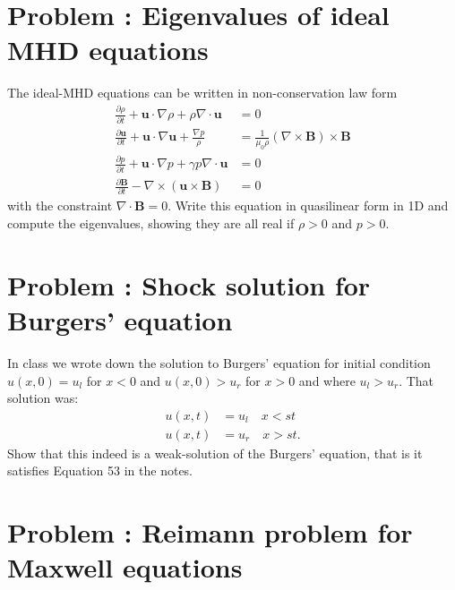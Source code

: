 \documentclass[12pt]{article}
\theoremstyle{definition}
\theoremstyle{definition}
\theoremstyle{definition}
\newcommand{\mvec}[1]{\mathbf{#1}}
\newcounter{probnum}
\begin{document}
\section*{Problem : Eigenvalues of ideal MHD equations}

The ideal-MHD equations can be written in non-conservation law form
\begin{align*}
  \frac{\partial \rho}{\partial t}+ \mvec{u}\cdot\nabla\rho + \rho\nabla\cdot\mathbf{u}&=0 \\
  \frac{\partial \mathbf{u}}{\partial t}+\mathbf{u} \cdot \nabla
  \mathbf{u}
  +\frac{\nabla p}{\rho} &=
                           {\frac{1}{\mu_{0}\rho}(\nabla \times \mathbf{B}) \times \mathbf{B}} \\
    \frac{\partial p}{\partial t}+\mathbf{u} \cdot \nabla p+\gamma p
  \nabla \cdot \mathbf{u} &= 0 \\
  {\frac{\partial \mathbf{B}}{\partial t}-\nabla \times(\mathbf{u} \times \mathbf{B})} &= {0}
\end{align*}
with the constraint $\nabla\cdot\mvec{B} = 0$. Write this equation in
quasilinear form in 1D and compute the eigenvalues, showing they are
all real if $\rho>0$ and $p>0$.

\section*{Problem : Shock solution for Burgers'
  equation}

In class we wrote down the solution to Burgers' equation for initial
condition $u(x,0) = u_l$ for $x<0$ and $u(x,0) > u_r$ for $x>0$ and
where $u_l > u_r$. That solution was:
\begin{align*}
  u(x,t) &= u_l \quad x < st \\
  u(x,t) &= u_r \quad x > st.
\end{align*}
Show that this indeed is a weak-solution of the Burgers' equation,
that is it satisfies Equation 53 in the notes.

\section*{Problem : Reimann problem for Maxwell
  equations}
\end{document}
